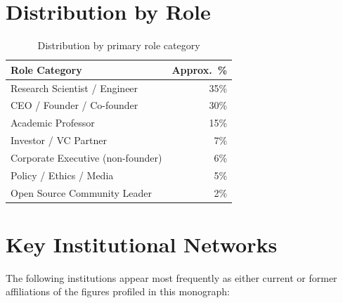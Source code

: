 \section{Distribution by Role}
\label{sec:appendix-roles}

\begin{table}[htbp]
\centering
\caption{Distribution by primary role category}
\label{tab:role-distribution}
\begin{tabularx}{0.7\textwidth}{Xr}
\hline
\textbf{Role Category} & \textbf{Approx.\ \%} \\
\hline
\rowcolor{figLightGray}
Research Scientist / Engineer & 35\% \\
CEO / Founder / Co-founder & 30\% \\
\rowcolor{figLightGray}
Academic Professor & 15\% \\
Investor / VC Partner & 7\% \\
\rowcolor{figLightGray}
Corporate Executive (non-founder) & 6\% \\
Policy / Ethics / Media & 5\% \\
\rowcolor{figLightGray}
Open Source Community Leader & 2\% \\
\hline
\end{tabularx}
\end{table}


\section{Key Institutional Networks}
\label{sec:appendix-networks}

The following institutions appear most frequently as either current or former affiliations
of the figures profiled in this monograph:


